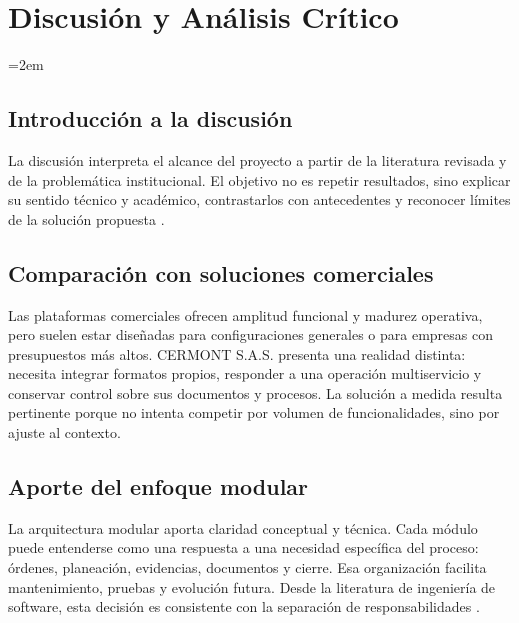 
\chapter{Discusión y Análisis Crítico}
\label{ch:discusion}

\setlength{\parindent}{0pt}
\setlength{\parskip}{6pt}
\sloppy
\emergencystretch=2em
\raggedbottom
\section{Introducción a la discusión}
\label{sec:introduccion-discusion}

La discusión interpreta el alcance del proyecto a partir de la literatura revisada y de la problemática institucional. El objetivo no es repetir resultados, sino explicar su sentido técnico y académico, contrastarlos con antecedentes y reconocer límites de la solución propuesta \cite{fieldaware2023,aberdeen2019,gartner2024,garcia2021,rodriguez2022,martinez2020}.

\section{Comparación con soluciones comerciales}
\label{sec:comparacion-comercial}

Las plataformas comerciales ofrecen amplitud funcional y madurez operativa, pero suelen estar diseñadas para configuraciones generales o para empresas con presupuestos más altos. CERMONT S.A.S. presenta una realidad distinta: necesita integrar formatos propios, responder a una operación multiservicio y conservar control sobre sus documentos y procesos. La solución a medida resulta pertinente porque no intenta competir por volumen de funcionalidades, sino por ajuste al contexto.

\section{Aporte del enfoque modular}
\label{sec:aporte-modular}

La arquitectura modular aporta claridad conceptual y técnica. Cada módulo puede entenderse como una respuesta a una necesidad específica del proceso: órdenes, planeación, evidencias, documentos y cierre. Esa organización facilita mantenimiento, pruebas y evolución futura. Desde la literatura de ingeniería de software, esta decisión es consistente con la separación de responsabilidades \cite{bass2021,richards2020,sommerville2016}.

